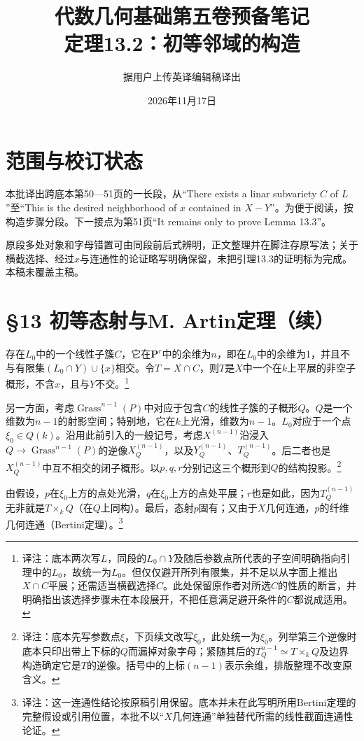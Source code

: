 \documentclass[openany,fontset=fandol]{ctexbook}
\newcommand{\note}[1]{\footnote{译注：#1}}
\begin{document}
\title{代数几何基础第五卷预备笔记\\定理13.2：初等邻域的构造}
\author{据用户上传英译编辑稿译出}
\date{2026年11月17日}
\maketitle
\chapter*{范围与校订状态}
本批译出跨底本第50—51页的一长段，从“There exists a linar subvariety $C$ of $L$”至“This is the desired neighborhood of $x$ contained in $X-Y$”。为便于阅读，按构造步骤分段。下一接点为第51页“It remains only to prove Lemma 13.3”。

原段多处对象和字母错置可由同段前后式辨明，正文整理并在脚注存原写法；关于横截选择、经过$x$与连通性的论证略写明确保留，未把引理13.3的证明标为完成。本稿未覆盖主稿。
\chapter*{§13 初等态射与M. Artin定理（续）}
存在$L_0$中的一个线性子簇$C$，它在$\mathbf P^r$中的余维为$n$，即在$L_0$中的余维为1，并且不与有限集$(L_0\cap Y)\cup\{x\}$相交。令$T=X\cap C$，则$T$是$X$中一个在$k$上平展的非空子概形，不含$x$，且与$Y$不交。\note{底本两次写$L$，同段的$L_0\cap Y$及随后参数点所代表的子空间明确指向引理中的$L_0$，故统一为$L_0$。但仅仅避开所列有限集，并不足以从字面上推出$X\cap C$平展；还需适当横截选择$C$。此处保留原作者对所选$C$的性质的断言，并明确指出该选择步骤未在本段展开，不把任意满足避开条件的$C$都说成适用。}

另一方面，考虑$\operatorname{Grass}^{n-1}(P)$中对应于包含$C$的线性子簇的子概形$Q$。$Q$是一个维数为$n-1$的射影空间；特别地，它在$k$上光滑，维数为$n-1$。$L_0$对应于一个点$\xi_0\in Q(k)$。沿用此前引入的一般记号，考虑$X^{(n-1)}$沿浸入$Q\to\operatorname{Grass}^{n-1}(P)$的逆像$X_Q^{(n-1)}$，以及$Y_Q^{(n-1)}$、$T_Q^{(n-1)}$。后二者也是$X_Q^{(n-1)}$中互不相交的闭子概形。以$p,q,r$分别记这三个概形到$Q$的结构投影。\note{底本先写参数点$\xi$，下页续文改写$\xi_0$，此处统一为$\xi_0$。列举第三个逆像时底本只印出带上下标的$Q$而漏掉对象字母；紧随其后的$T_Q^{n-1}\simeq T\times_k Q$及边界构造确定它是$T$的逆像。括号中的上标$(n-1)$表示余维，排版整理不改变原含义。}

由假设，$p$在$\xi_0$上方的点处光滑，$q$在$\xi_0$上方的点处平展；$r$也是如此，因为$T_Q^{(n-1)}$无非就是$T\times_k Q$（在$Q$上同构）。最后，态射$p$固有；又由于$X$几何连通，$p$的纤维几何连通（Bertini定理）。\note{这一连通性结论按原稿引用保留。底本并未在此写明所用Bertini定理的完整假设或引用位置，本批不以“$X$几何连通”单独替代所需的线性截面连通性论证。}
\end{document}
